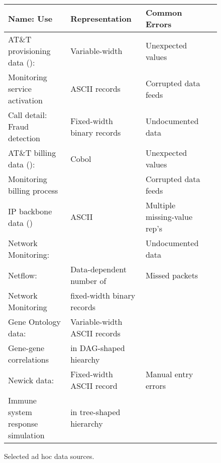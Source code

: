 \documentclass[11pt]{article}
\begin{document}
\begin{figure*}
\begin{center}
\begin{tabular}{@{}|l|l|l|l|}
\hline
Name: Use                           & Representation    
           & Common Errors \\ \hline\hline
AT\&T provisioning data (\dibbler{}): & Variable-width    
& Unexpected values \\ 
Monitoring service activation         & ASCII records     
& Corrupted data feeds \\ \hline
Call detail: Fraud detection                   & Fixed-width binary records  
&  Undocumented data\\\hline 
AT\&T billing data (\ningaui{}):      & Cobol  
& Unexpected values\\ 
Monitoring billing process   &                             
& Corrupted data feeds \\ \hline
IP backbone data (\darkstar{})  & ASCII  
& Multiple missing-value rep's \\
Network Monitoring:  &        
& Undocumented data \\ \hline
Netflow:                               & Data-dependent number of   
& Missed packets\\ 
Network Monitoring        & fixed-width binary records  
& \\ \hline
Gene Ontology data:        & Variable-width ASCII records 
&  \\
Gene-gene correlations & in DAG-shaped hiearchy 
& \\\hline
Newick data:                          & Fixed-width ASCII record 
& Manual entry errors \\
Immune system response simulation & in tree-shaped hierarchy 
& \\
\hline
\end{tabular}
\caption{Selected ad hoc data sources.}
\label{figure:data-sources}
\end{center}
\end{figure*}
\end{document}
